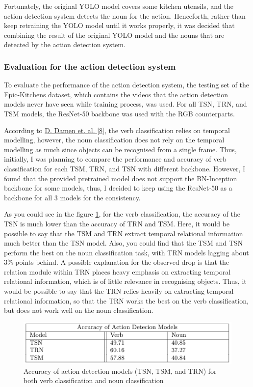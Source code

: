 \documentclass{article}
\begin{document}
Fortunately, the original YOLO model covers some kitchen utensils, and the action detection system detects the noun for the action. Henceforth, rather than keep retraining the YOLO model until it works properly, it was decided that combining the result of the original YOLO model and the nouns that are detected by the action detection system.


\subsubsection{Evaluation for the action detection system}

To evaluate the performance of the action detection system, the testing set of the Epic-Kitchens dataset, which contains the videos that the action detection models never have seen while training process, was used. For all TSN, TRN, and TSM models, the ResNet-50 backbone was used with the RGB counterparts.

According to \hyperlink{ref8}{D. Damen et. al. [8]}, the verb classification relies on temporal modelling, however, the noun classification does not rely on the temporal modelling as much since objects can be recognised from a single frame. Thus, initially, I was planning to compare the performance and accuracy of verb classification for each TSM, TRN, and TSN with different backbone. However, I found that the provided pretrained model does not support the BN-Inception backbone for some models, thus, I decided to keep using the ResNet-50 as a backbone for all 3 models for the consistency.

As you could see in the figure \ref{fig:chartForEvalActionDetection}, for the verb classification, the accuracy of the TSN is much lower than the accuracy of TRN and TSM. Here, it would be possible to say that the TSM and TRN extract temporal relational information much better than the TSN model. Also, you could find that the TSM and TSN perform the best on the noun classification task, with TRN models lagging about 3\% points behind. A possible explanation for the observed drop is that the relation module within TRN places heavy emphasis on extracting temporal relational information, which is of little relevance in recognising objects. Thus, it would be possible to say that the TRN relies heavily on extracting temporal relational information, so that the TRN works the best on the verb classification, but does not work well on the noun classification.

\begin{figure}[H]
    \centering
    \includegraphics[scale=0.5]{imgs/action_detection_accuracy.png}
    \caption{Accuracy of action detection models (TSN, TSM, and TRN) for both verb classification and noun classification}
    \label{fig:chartForEvalActionDetection}
\end{figure}
\end{document}
